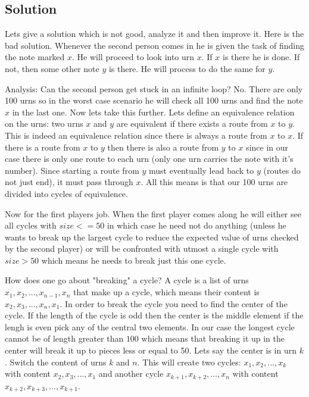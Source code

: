 \documentclass{article}
\begin{document}
\subsection{Solution}
Lets give a solution which is not good, analyze it and then improve it.
Here is the bad solution. Whenever the second person comes in he is given the task of finding the note marked $x$. He will proceed to look into urn $x$. If $x$ is there he is done. If not, then some other note $y$ is there. He will process to do the same for $y$.

Analysis: Can the second person get stuck in an infinite loop? No. There are only 100 urns so in the worst case scenario he will check all 100 urns and find the note $x$ in the last one. Now lets take this further. Lets define an equivalence relation on the urns: two urns $x$ and $y$ are equivalent if there exists a route from $x$ to $y$. This is indeed an equivalence relation since there is always a route from $x$ to $x$. If there is a route from $x$ to $y$ then there is also a route from $y$ to $x$ since in our case there is only one route to each urn (only one urn carries the note with it's number). Since starting a route from $y$ must eventually lead back to $y$ (routes do not just end), it must pass through $x$. All this means is that our 100 urns are divided into cycles of equivalence.

Now for the first players job. When the first player comes along he will either see all cycles with $size<=50$ in which case he need not do anything (unless he wants to break up the largest cycle to reduce the expected value of urns checked by the second player) or will be confronted with utmost a single cycle with $size > 50$ which means he needs to break just this one cycle.

How does one go about "breaking" a cycle? A cycle is a list of urns $x_1, x_2, ...,x_{n-1} ,x_n$ that make up a cycle, which means their content is $x_2, x_3,..., x_n, x_1$. In order to break the cycle you need to find the center of the cycle. If the length of the cycle is odd then the center is the middle element if the lengh is even pick any of the central two elements. In our case the longest cycle cannot be of length greater than $100$ which means that breaking it up in the center will  break it up to pieces less or equal to 50. Lets say the center is in urn $k$. Switch the content of urns $k$ and $n$. This will create two cycles: $x_1, x_2, ... , x_k$ with content $x_2, x_3, ... , x_1$ and another cycle $x_{k+1}, x_{k+2}, ... , x_n$ with content $x_{k+2}, x_{k+3}, ... , x_{k+1}$.
\end{document}
